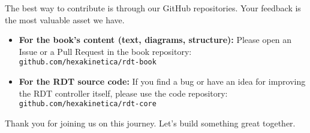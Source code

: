 The best way to contribute is through our GitHub repositories. Your feedback is the most valuable asset we have.

\begin{itemize}
    \item \textbf{For the book's content (text, diagrams, structure):} Please open an Issue or a Pull Request in the book repository: \\
    \texttt{github.com/hexakinetica/rdt-book}

    \item \textbf{For the RDT source code:} If you find a bug or have an idea for improving the RDT controller itself, please use the code repository: \\
    \texttt{github.com/hexakinetica/rdt-core}
\end{itemize}

Thank you for joining us on this journey. Let's build something great together.